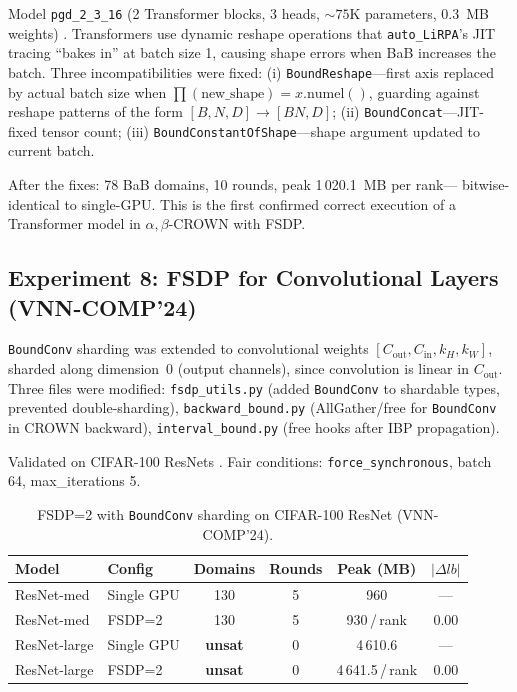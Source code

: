\documentclass[11pt]{article}
\begin{document}
Model \texttt{pgd\_2\_3\_16} (2 Transformer blocks, 3 heads, ${\sim}75$K
parameters, 0.3~MB weights) \citep{arXiv2312VNNCOMP2023}. Transformers use
dynamic reshape operations that \texttt{auto\_LiRPA}'s JIT tracing ``bakes in''
at batch size 1, causing shape errors when BaB increases the batch.
Three incompatibilities were fixed: (i) \texttt{BoundReshape}---first axis
replaced by actual batch size when $\prod(\text{new\_shape}) = x.\text{numel}()$,
guarding against reshape patterns of the form $[B,N,D]\to[BN,D]$; (ii)
\texttt{BoundConcat}---JIT-fixed tensor count; (iii)
\texttt{BoundConstantOfShape}---shape argument updated to current batch.

After the fixes: 78 BaB domains, 10 rounds, peak 1\,020.1~MB per rank---
bitwise-identical to single-GPU. This is the first confirmed correct execution
of a Transformer model in $\alpha,\beta$-CROWN with FSDP.

\subsection{Experiment 8: FSDP for Convolutional Layers (VNN-COMP'24)}
\label{sec:exp8}

\texttt{BoundConv} sharding was extended to convolutional weights
$[C_\text{out}, C_\text{in}, k_H, k_W]$, sharded along dimension~0
(output channels), since convolution is linear in $C_\text{out}$.
Three files were modified: \texttt{fsdp\_utils.py} (added \texttt{BoundConv}
to shardable types, prevented double-sharding), \texttt{backward\_bound.py}
(AllGather/free for \texttt{BoundConv} in CROWN backward),
\texttt{interval\_bound.py} (free hooks after IBP propagation).

Validated on CIFAR-100 ResNets \citep{arXiv2412VNNCOMP2024}.
Fair conditions: \texttt{force\_synchronous}, batch 64, max\_iterations 5.

\begin{table}[h]
\caption{FSDP=2 with \texttt{BoundConv} sharding on CIFAR-100 ResNet
(VNN-COMP'24).}
\label{tab:fsdp-conv}
\vskip 0.1in
\begin{center}
\begin{tabular}{llcccc}
\toprule
Model & Config & Domains & Rounds & Peak (MB) & $|\Delta lb|$ \\
\midrule
ResNet-med   & Single GPU & 130 & 5 & 960 & --- \\
ResNet-med   & FSDP=2     & 130 & 5 & 930\,/\,rank & 0.00 \\
ResNet-large & Single GPU & \textbf{unsat} & 0 & 4\,610.6 & --- \\
ResNet-large & FSDP=2     & \textbf{unsat} & 0 & 4\,641.5\,/\,rank & 0.00 \\
\bottomrule
\end{tabular}
\end{center}
\end{table}
\end{document}
